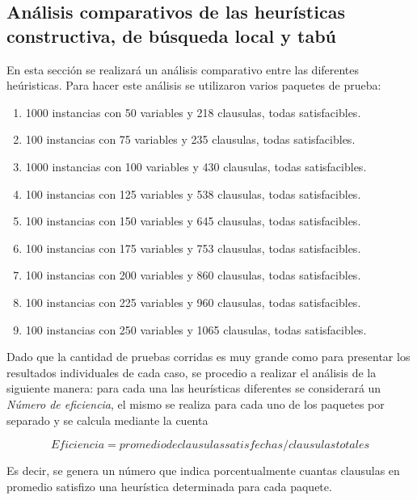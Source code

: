 \documentclass[a4paper,10pt]{article}
\begin{document}
\subsection*{An\'alisis comparativos de las heur\'isticas constructiva, de b\'usqueda local y tab\'u}

En esta secci\'on se realizar\'a un an\'alisis comparativo entre las diferentes he\'uristicas. Para hacer este an\'alisis se utilizaron varios paquetes de prueba:

\begin{enumerate}
\item 1000 instancias con 50 variables y 218 clausulas, todas satisfacibles.
\item 100 instancias con 75 variables y 235 clausulas, todas satisfacibles.
\item 1000 instancias con 100 variables y 430 clausulas, todas satisfacibles.
\item 100 instancias con 125 variables y 538 clausulas, todas satisfacibles.
\item 100 instancias con 150 variables y 645 clausulas, todas satisfacibles.
\item 100 instancias con 175 variables y 753 clausulas, todas satisfacibles.
\item 100 instancias con 200 variables y 860 clausulas, todas satisfacibles.
\item 100 instancias con 225 variables y 960 clausulas, todas satisfacibles.
\item 100 instancias con 250 variables y 1065 clausulas, todas satisfacibles.
\end{enumerate}

Dado que la cantidad de pruebas corridas es muy grande como para presentar los resultados individuales de cada caso, se procedio a realizar el an\'alisis de la siguiente manera: para cada una las heur\'isticas diferentes se considerar\'a un \emph{N\'umero de eficiencia}, el mismo se realiza para cada uno de los paquetes por separado y se calcula mediante la cuenta 

\begin{equation}
 Eficiencia = promedio de clausulas satisfechas/clausulas totales
\end{equation}

Es decir, se genera un n\'umero que indica porcentualmente cuantas clausulas en promedio satisfizo una heur\'istica determinada para cada paquete.
\end{document}
